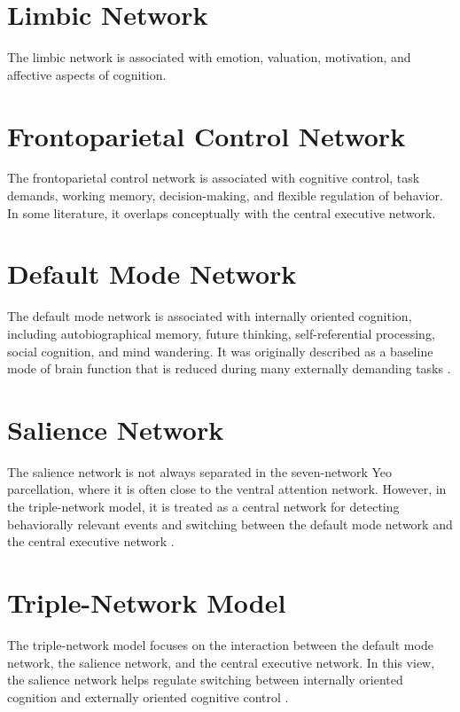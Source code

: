 \documentclass[a4paper]{article}
\begin{document}
    
    \section{Limbic Network}
        
        The limbic network is associated with emotion, valuation, motivation, and affective aspects of cognition.
    
    
    \section{Frontoparietal Control Network}
        
        The frontoparietal control network is associated with cognitive control, task demands, working memory, decision-making, and flexible regulation of behavior. In some literature, it overlaps conceptually with the central executive network.
    
    
    \section{Default Mode Network}
        
        The default mode network is associated with internally oriented cognition, including autobiographical memory, future thinking, self-referential processing, social cognition, and mind wandering. It was originally described as a baseline mode of brain function that is reduced during many externally demanding tasks \citep{raichle-2001-a-default-mode-of-brain-function}.
    
    
    \section{Salience Network}
        
        The salience network is not always separated in the seven-network Yeo parcellation, where it is often close to the ventral attention network. However, in the triple-network model, it is treated as a central network for detecting behaviorally relevant events and switching between the default mode network and the central executive network \citep{menon-2011-large-scale-brain-networks-and-psychopathology,menon-2010-saliency-switching-attention-and-control}.
    
    
    \section{Triple-Network Model}
        
        The triple-network model focuses on the interaction between the default mode network, the salience network, and the central executive network. In this view, the salience network helps regulate switching between internally oriented cognition and externally oriented cognitive control \citep{menon-2011-large-scale-brain-networks-and-psychopathology}.
        
        
\end{document}
